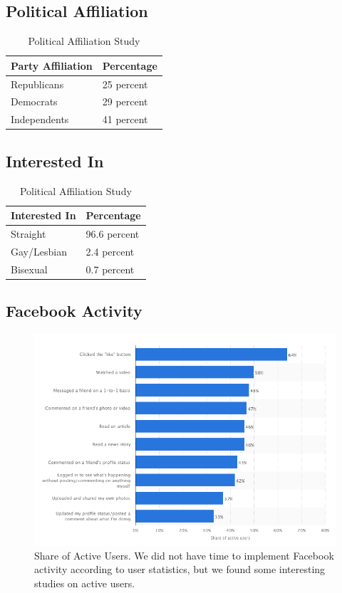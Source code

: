 \documentclass{article}
\begin{document}
\subsection{Political Affiliation}
\begin{table}[H]
\centering
\begin{tabular}{|p{3cm}||p{3cm}|} 
 \hline
 Party Affiliation & Percentage \\ [0.5ex] 
 \hline\hline
 Republicans & 25 percent \\
 \hline
 Democrats & 29 percent \\
 \hline
 Independents & 41 percent \\ [1ex] 
 \hline
\end{tabular}
\caption{Political Affiliation Study \cite{polstatuswebsite}}
\label{table:3}
\end{table}

\subsection{Interested In}
\begin{table}[H]
\centering
\begin{tabular}{|p{3cm}||p{3cm}|} 
 \hline
 Interested In & Percentage \\ [0.5ex] 
 \hline\hline
 Straight & 96.6 percent \\
 \hline
 Gay/Lesbian & 2.4 percent \\
 \hline
 Bisexual & 0.7 percent \\ [1ex] 
 \hline
\end{tabular}
\caption{Political Affiliation Study \cite{interestedinwebsite}}
\label{table:4}
\end{table}

\subsection{Facebook Activity}
\begin{figure}[H]
  \includegraphics[width=\linewidth]{fbact.png}
  \caption{Share of Active Users. \cite{fbactwebsite} We did not have time to implement Facebook activity according to user statistics, but we found some interesting studies on active users.}
  \label{fig:fbact}
\end{figure}
\end{document}

